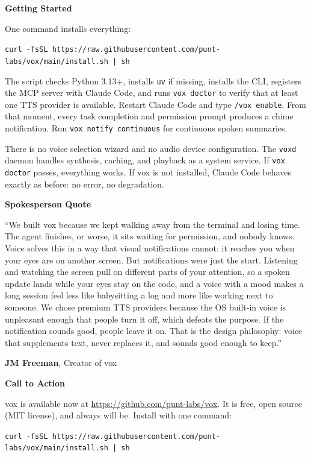 \documentclass[11pt,letterpaper]{article}
\newcommand{\prsection}[1]{%
  \vspace{1em}%
  {\large\bfseries\color{SectionBlue}#1}%
  \vspace{0.3em}\par%
}
\begin{document}
\prsection{Getting Started}

One command installs everything:

{\small\texttt{curl -fsSL https://raw.githubusercontent.com/punt-labs/vox/main/install.sh | sh}}

The script checks Python 3.13+, installs \texttt{uv} if missing, installs
the CLI, registers the MCP server with Claude Code, and runs
\texttt{vox doctor} to verify that at least one TTS provider is available.
Restart Claude Code and type \texttt{/vox enable}. From that moment, every
task completion and permission prompt produces a chime notification.
Run \texttt{vox notify continuous} for continuous spoken summaries.

There is no voice selection wizard and no audio device configuration. The
\texttt{voxd} daemon handles synthesis, caching, and playback as a system
service. If \texttt{vox doctor} passes, everything works. If vox is not
installed, Claude Code behaves exactly as before: no error, no
degradation.

\prsection{Spokesperson Quote}

\begin{spokespersonquote}
``We built vox because we kept walking away from the terminal and losing
time. The agent finishes, or worse, it sits waiting for permission, and nobody
knows. Voice solves this in a way that visual notifications cannot:
it reaches you when your eyes are on another screen. But notifications were
just the start. Listening and watching the screen pull on different parts of
your attention, so a spoken update lands while your eyes stay on the code, and a
voice with a mood makes a long session feel less like babysitting a log and
more like working next to someone. We chose premium TTS
providers because the OS built-in voice is unpleasant enough that people turn
it off, which defeats the purpose. If the notification sounds good, people
leave it on. That is the design philosophy: voice that supplements text,
never replaces it, and sounds good enough to keep.''

\raggedleft \textbf{JM Freeman}, Creator of vox
\end{spokespersonquote}

\prsection{Call to Action}

vox is available now at
\url{https://github.com/punt-labs/vox}. It is free, open source (MIT license),
and always will be. Install with one command:

{\small\texttt{curl -fsSL https://raw.githubusercontent.com/punt-labs/vox/main/install.sh | sh}}
\end{document}
